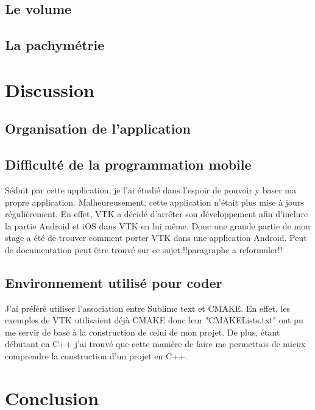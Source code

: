 \documentclass[a4paper,12pt]{article}
\begin{document}
	\subsection{Le volume}

	\subsection{La pachymétrie}


\newpage
\section{Discussion}
	\subsection{Organisation de l'application}
	\subsection{Difficulté de la programmation mobile}
	 Séduit par cette application, je l'ai étudié dans l'espoir de pouvoir y baser ma propre application. Malheureusement, cette application n'était plus mise à jours régulièrement. En effet, VTK a décidé d'arrêter son développement afin d'inclure la partie Android et iOS dans VTK en lui même. Donc une grande partie de mon stage a été de trouver comment porter VTK dans une application Android. Peut de documentation peut être trouvé sur ce sujet.!!paragraphe a reformuler!!
	 \subsection{Environnement utilisé pour coder}
J'ai préféré utiliser l'association entre Sublime text et CMAKE. En effet, les exemples de VTK utilisaient déjà CMAKE donc leur "CMAKELists.txt" ont pu me servir de base à la construction de celui de mon projet. De plus, étant débutant en C++ j'ai trouvé que cette manière de faire me permettais de mieux comprendre la construction d'un projet en C++.

\newpage
\section{Conclusion}
	
		
\end{document}

